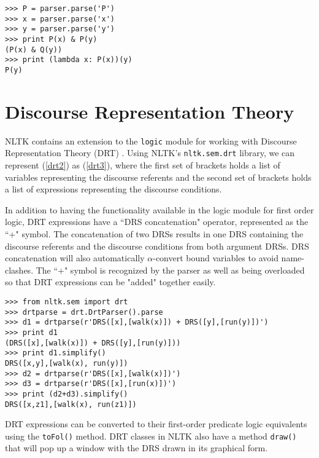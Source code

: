 \documentclass[11pt]{article}
\newcommand{\dhgdrs}[2]
{
    {
    \it
    \begin{tabular}{|l|}
    \hline
    ~ \vspace{-2ex} \\
    #1
    \\
    ~ \vspace{-2ex} \\
    \hline
    ~ \vspace{-2ex} \\
    #2
    \\
    ~ \\    %
    \hline
    \end{tabular}
    }
}
\newcommand{\dhgcode}[1]{{\tt #1}}
\begin{document}
\begin{verbatim}
>>> P = parser.parse('P')
>>> x = parser.parse('x')
>>> y = parser.parse('y')
>>> print P(x) & P(y)
(P(x) & Q(y))
>>> print (lambda x: P(x))(y)
P(y)
\end{verbatim}


\section{Discourse Representation Theory}
NLTK contains an extension to the \dhgcode{logic} module for working with Discourse Representation Theory (DRT) \cite{KampReyle}.  Using NLTK's \dhgcode{nltk.sem.drt} library, we can represent (\ref{drt2}) as (\ref{drt3}), where the first set of brackets holds a list of variables representing the discourse referents and the second set of brackets holds a list of expressions representing the discourse conditions.

\enumsentence{\label{drt2}\dhgdrs{j,d}{(John = j)\\dog(d)\\sees(j,d)}}
\enumsentence{\label{drt3}\dhgcode{DRS([j,d],[(John = j), dog(d), sees(j,d)])}}

In addition to having the functionality available in the logic module for first order logic, DRT expressions have a ``DRS concatenation" operator, represented as the ``+" symbol.  The concatenation of two DRSs results in one DRS containing the discourse referents and the discourse conditions from both argument DRSs.  DRS concatenation will also automatically $\alpha$-convert bound variables to avoid name-clashes.  The ``+" symbol is recognized by the parser as well as being overloaded so that DRT expressions can be "added" together easily.

\begin{verbatim}
>>> from nltk.sem import drt
>>> drtparse = drt.DrtParser().parse
>>> d1 = drtparse(r'DRS([x],[walk(x)]) + DRS([y],[run(y)])')
>>> print d1
(DRS([x],[walk(x)]) + DRS([y],[run(y)]))
>>> print d1.simplify()
DRS([x,y],[walk(x), run(y)])
>>> d2 = drtparse(r'DRS([x],[walk(x)])')
>>> d3 = drtparse(r'DRS([x],[run(x)])')
>>> print (d2+d3).simplify()
DRS([x,z1],[walk(x), run(z1)])
\end{verbatim}

DRT expressions can be converted to their first-order predicate logic equivalents using the \dhgcode{toFol()} method.  DRT classes in NLTK also have a method \dhgcode{draw()} that will pop up a window with the DRS drawn in its graphical form.
\end{document}
